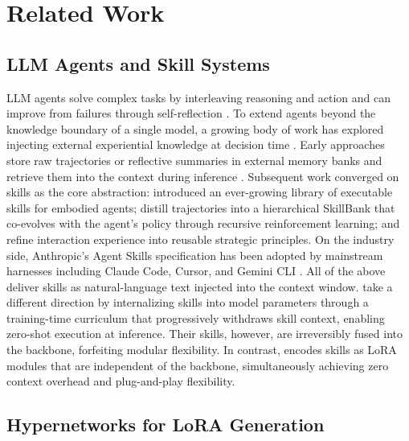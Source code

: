 \section{Related Work}
\subsection{LLM Agents and Skill Systems}
 
LLM agents solve complex tasks by interleaving reasoning and action \citep{Yao2023ReAct} and can improve from failures through self-reflection \citep{Shinn2023Reflexion}. To extend agents beyond the knowledge boundary of a single model, a growing body of work has explored injecting external experiential knowledge at decision time \citep{zhou2026externalization}. Early approaches store raw trajectories or reflective summaries in external memory banks and retrieve them into the context during inference \citep{Zhao2024ExpeL, Chhikara2025Mem0}. Subsequent work converged on skills as the core abstraction: \citet{Wang2023Voyager} introduced an ever-growing library of executable skills for embodied agents; \citet{Xia2026SkillRL} distill trajectories into a hierarchical SkillBank that co-evolves with the agent's policy through recursive reinforcement learning; and \citet{Wu2025EvolveR} refine interaction experience into reusable strategic principles.  On the industry side, Anthropic's Agent Skills specification has been adopted by mainstream harnesses including Claude Code, Cursor, and Gemini CLI \citep{SkillsBench2026, yang2025surveyaiagentprotocols}. All of the above deliver skills as natural-language text injected into the context window. \citet{Lu2026Skill0} take a different direction by internalizing skills into model parameters through a training-time curriculum that progressively withdraws skill context, enabling zero-shot execution at inference. Their skills, however, are irreversibly fused into the backbone, forfeiting modular flexibility. In contrast, \method{} encodes skills as LoRA modules that are independent of the backbone, simultaneously achieving zero context overhead and plug-and-play flexibility.
 
\subsection{Hypernetworks for LoRA Generation}
 
